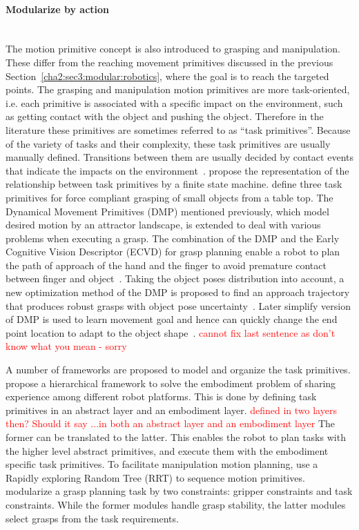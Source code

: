\paragraph{Modularize by action}
~\\
The motion primitive concept is also introduced to grasping and manipulation. These differ from the reaching movement primitives discussed in the previous Section~\ref{cha2:sec3:modular:robotics}, where the goal is to reach the targeted points. The grasping and manipulation motion primitives are more task-oriented, i.e. each primitive is associated with a specific impact on the environment, such as getting contact with the object and pushing the object. Therefore in the literature these primitives are sometimes referred to as ``task primitives''. Because of the variety of tasks and their complexity, these task primitives are usually manually defined. Transitions between them are usually decided by contact events that indicate the impacts on the environment~\citep{morrow1997manipulation}. \citet{michelman1994forming} propose the representation of the relationship between task primitives by a finite state machine. \citet{kazemi2012robust} define three task primitives for force compliant grasping of small objects from a table top. The Dynamical Movement Primitives (DMP) mentioned previously, which model desired motion by an attractor landscape, is extended to deal with various problems when executing a grasp. The combination of the DMP and the Early Cognitive Vision Descriptor (ECVD) for grasp planning enable a robot to plan the path of  approach of the hand and the finger to avoid premature contact between finger and object~\citep{kroemer2011grasping}. Taking the object poses distribution into account, a new optimization method of the DMP is proposed to find an approach trajectory that produces robust grasps with object pose uncertainty~\citep{stulp2011learning}. Later simplify version of DMP is used to learn movement goal and hence can quickly change the end point location to adapt to the object shape~\citep{stulp2011learning,stulp2012reinforcement}.
\textcolor{red}{cannot fix last sentence as don't know what you mean - sorry}

A number of frameworks are proposed to model and organize the task primitives. \citet{laaksonen2010embodiment,felip2013manipulation} propose a hierarchical framework to solve the embodiment problem of sharing experience among different robot platforms. This is done by defining task primitives in an abstract layer and an embodiment layer.
\textcolor{red}{defined in two layers then? Should it say ...in both an abstract layer and an embodiment layer}
The former can be translated to the latter. This enables the robot to plan tasks with the higher level abstract primitives, and execute them with the embodiment specific task primitives. To facilitate manipulation motion planning, \citet{barry2013manipulation} use a Rapidly exploring Random Tree (RRT) to sequence motion primitives. \citet{detry2013generalizing} modularize a grasp planning task by two constraints: gripper constraints and task constraints. While the former modules handle grasp stability, the latter modules select grasps from the task requirements.

